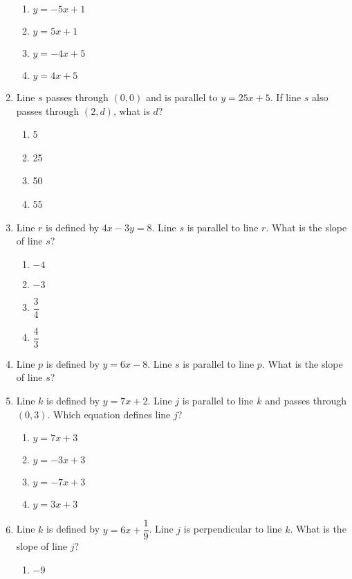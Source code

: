 \documentclass[12pt]{exam}
\begin{document}
\begin{enumerate}
    \begin{enumerate}[label=\Alph*)]
        \item $y = -5x + 1$
        \item $y = 5x + 1$
        \item $y = -4x + 5$
        \item $y = 4x + 5$
    \end{enumerate}
    \item Line $s$ passes through $(0,0)$ and is parallel to $y = 25x + 5$. If line $s$ also passes through $(2,d)$, what is $d$?
    \begin{enumerate}[label=\Alph*)]
        \item 5
        \item 25
        \item 50
        \item 55
    \end{enumerate}
    \item Line $r$ is defined by $4x - 3y = 8$. Line $s$ is parallel to line $r$. What is the slope of line $s$?
    \begin{enumerate}[label=\Alph*)]
        \item $-4$
        \item $-3$
        \item $\dfrac{3}{4}$
        \item $\dfrac{4}{3}$
    \end{enumerate}
    \item Line $p$ is defined by $y = 6x - 8$. Line $s$ is parallel to line $p$. What is the slope of line $s$?
    \item Line $k$ is defined by $y = 7x + 2$. Line $j$ is parallel to line $k$ and passes through $(0,3)$. Which equation defines line $j$?
    \begin{enumerate}[label=\Alph*)]
        \item $y = 7x + 3$
        \item $y = -3x + 3$
        \item $y = -7x + 3$
        \item $y = 3x + 3$
    \end{enumerate}
    \item Line $k$ is defined by $y = 6x + \dfrac{1}{9}$. Line $j$ is perpendicular to line $k$. What is the slope of line $j$?
    \begin{enumerate}[label=\Alph*)]
        \item $-9$

\end{enumerate}
\end{enumerate}
\end{document}
